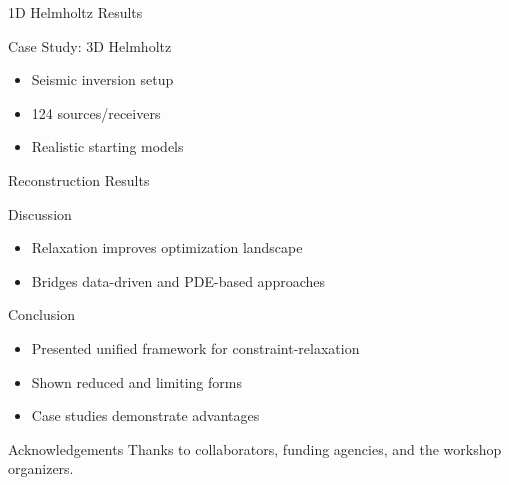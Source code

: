 \documentclass{beamer}
\begin{document}
\begin{frame}{1D Helmholtz Results}
\end{frame}

\begin{frame}{Case Study: 3D Helmholtz}
\begin{itemize}
  \item Seismic inversion setup
  \item 124 sources/receivers
  \item Realistic starting models
\end{itemize}
\end{frame}

\begin{frame}{Reconstruction Results}
\end{frame}

\begin{frame}{Discussion}
\begin{itemize}
  \item Relaxation improves optimization landscape
  \item Bridges data-driven and PDE-based approaches
\end{itemize}
\end{frame}

\begin{frame}{Conclusion}
\begin{itemize}
  \item Presented unified framework for constraint-relaxation
  \item Shown reduced and limiting forms
  \item Case studies demonstrate advantages
\end{itemize}
\end{frame}

\begin{frame}{Acknowledgements}
\small
Thanks to collaborators, funding agencies, and the workshop organizers.
\end{frame}
\end{document}
